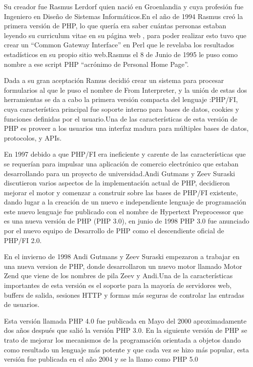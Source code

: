 \documentclass[11pt]{article} %
\begin{document}
Su creador fue  Rasmus  Lerdorf  quien nació en  Groenlandia  y cuya  profesión fue Ingeniero en Diseño de Sistemas Informáticos.En el año de 1994 Rasmus creó la primera versión de PHP, lo que quería era saber cuántas personas estaban leyendo su curriculum vitae en 
su página web , para poder realizar esto tuvo que crear  un   “Common Gateway Interface” en  Perl  que le revelaba  los resultados estadísticos en su propio sitio web.Rasmus el 8 de Junio de 1995 le puso como nombre a ese script PHP  “acrónimo de Personal Home Page”.

Dada a su gran aceptación Ramus decidió crear  un sistema para procesar formularios al que le puso el nombre de From Interpreter, y la unión de estas dos herramientas  se da  a cabo  la primera versión compacta del lenguaje :PHP/FI, cuya característica principal fue soporte interno para bases de datos, cookies y funciones definidas por el usuario.Una de las características de esta versión de PHP es proveer a los usuarios  una interfaz madura para múltiples bases de datos, protocolos, y APIs.

En 1997 debido a que PHP/FI era ineficiente y carente de las características que se requerían para impulsar una aplicación de comercio electrónico que estaban desarrollando para un proyecto de universidad.Andi Gutmans y Zeev Suraski discutieron varios aspectos de la implementación actual de PHP, decidieron mejorar el motor y comenzar a construir sobre las bases de PHP/FI existente, dando lugar a la creación de un nuevo e independiente lenguaje de programación este nuevo lenguaje fue publicado con el nombre de Hypertext  Preprocessor que es una nueva versión de PHP (PHP 3.0), en junio de 1998  PHP 3.0 fue anunciado por el nuevo equipo de Desarrollo de PHP como el descendiente oficial de PHP/FI 2.0.

En el invierno de 1998 Andi Gutmans y Zeev Suraski empezaron a trabajar en una nueva version de PHP, donde desarrollaron un nuevo motor llamado Motor Zend que viene de los nombres de pila Zeev y Andi.Una de la características importantes de esta versión es el soporte para la mayoría de servidores web, buffers de salida, sesiones HTTP y formas más seguras de controlar las entradas de usuarios.

Esta versión llamada PHP 4.0 fue publicada en Mayo del 2000 aproximadamente  dos años después que salió la versión PHP 3.0.
En la siguiente versión de PHP se trato de mejorar los mecanismos de la programación orientada a objetos dando como resultado un lenguaje más potente y que cada vez se hizo más popular, esta versión fue publicada en el año 2004 y se la llamo como PHP 5.0 
 
\end{document}
